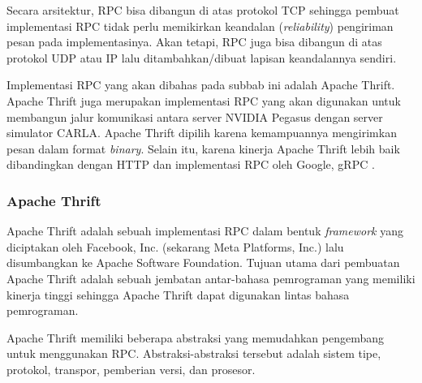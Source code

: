 Secara arsitektur, RPC bisa dibangun di atas protokol TCP sehingga pembuat
implementasi RPC tidak perlu memikirkan keandalan (\textit{reliability})
pengiriman pesan pada implementasinya. Akan tetapi, RPC juga bisa dibangun di
atas protokol UDP atau IP lalu ditambahkan/dibuat lapisan keandalannya sendiri.

Implementasi RPC yang akan dibahas pada subbab ini adalah Apache Thrift.
Apa\-che Thrift juga merupakan implementasi RPC yang akan digunakan untuk
membangun jalur komunikasi antara server NVIDIA Pegasus dengan server simulator
CARLA. Apache Thrift dipilih karena kemampuannya mengirimkan pesan dalam format
\textit{binary}. Selain itu, karena kinerja Apache Thrift lebih baik
dibandingkan dengan HTTP dan implementasi RPC oleh Google, gRPC
\parencite{abernethy_buildingHighPerformanceMSThrift}.

\subsubsection{Apache Thrift}

Apache Thrift adalah sebuah implementasi RPC dalam bentuk \textit{framework}
yang diciptakan oleh Facebook, Inc. (sekarang Meta Platforms, Inc.) lalu
disumbangkan ke Apache Software Foundation. Tujuan utama dari pembuatan Apache
Thrift adalah sebuah jembatan antar-bahasa pemrograman yang memiliki kinerja
tinggi \parencite{agarwal_thrift} sehingga Apache Thrift dapat digunakan lintas
bahasa pemrograman.

Apache Thrift memiliki beberapa abstraksi yang memudahkan pengembang untuk
menggunakan RPC. Abstraksi-abstraksi tersebut adalah sistem tipe, protokol,
transpor, pemberian versi, dan prosesor.

